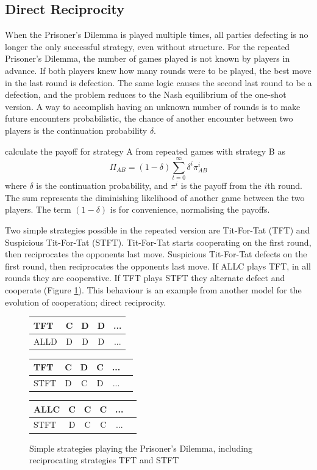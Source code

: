 \documentclass[a4paper,11pt]{article}
\begin{document}
\subsection{Direct Reciprocity}
When the Prisoner's Dilemma is played multiple times, all parties defecting is no longer the only successful strategy, even without structure. 
For the repeated Prisoner's Dilemma, the number of games played is not known by players in advance. 
If both players knew how many rounds were to be played, the best move in the last round is defection. 
The same logic causes the second last round to be a defection, and the problem reduces to the Nash equilibrium of the one-shot version. 
A way to accomplish having an unknown number of rounds is to make future encounters probabilistic, the chance of another encounter between two players is the continuation probability $\delta$.

\citet{garcia:PLoSOne:2012} calculate the payoff for strategy A from repeated games with strategy B as
\begin{equation}
\label{eqn:repeatedPayoff}
\Pi_{AB}=(1-\delta)\sum^{\infty}_{t=0} \delta^i\pi^i_{AB}
\end{equation}
where $\delta$ is the continuation probability, and $\pi^i$ is the payoff from the $i$th round. 
The sum represents the diminishing likelihood of another game between the two players. 
The term $(1-\delta)$ is for convenience, normalising the payoffs.
 
Two simple strategies possible in the repeated version are Tit-For-Tat (TFT) and Suspicious Tit-For-Tat (STFT). 
Tit-For-Tat starts cooperating on the first round, then reciprocates the opponents last move. 
Suspicious Tit-For-Tat defects on the first round, then reciprocates the opponents last move. 
If ALLC plays TFT, in all rounds they are cooperative.  
If TFT plays STFT they alternate defect and cooperate (Figure \ref{table:reciprocity}). 
This behaviour is an example from another model for the evolution of cooperation; direct reciprocity. 

\begin{figure}[h]
\centering
\captionsetup{justification=centering}
\begin{tabular}{|l|c|c|c|c|}
\hline
TFT & C & D & D&...\\
\hline
ALLD & D & D &D&...\\
\hline
\end{tabular}\hfill
\begin{tabular}{|l|c|c|c|c|c|}
\hline
TFT & C & D&C&...\\
\hline
STFT & D & C&D&...\\
\hline
\end{tabular}\hfill
\begin{tabular}{|l|c|c|c|c|c|}
\hline
ALLC & C & C&C&...\\
\hline
STFT & D & C&C&...\\
\hline
\end{tabular}\hfill
\caption{Simple strategies playing the Prisoner's Dilemma, including reciprocating strategies TFT and STFT }
\label{table:reciprocity}
\end{figure}
\end{document}
